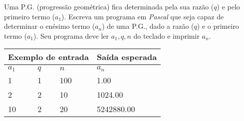 \item Uma P.G. (progressão geométrica) fica determinada pela sua razão ($q$) 
e pelo primeiro termo ($a_1$). Escreva um programa em \emph{Pascal} que 
seja capaz de determinar o enésimo termo ($a_n$) de uma P.G., dado a razão 
($q$) e o primeiro termo ($a_1$). Seu programa deve ler $a_1, q, n$ do 
teclado e imprimir $a_n$.

\begin{center}
\begin{tabular}{|l|l|l|l|} \hline
\multicolumn{3}{|c|}{Exemplo de entrada} & Saída esperada \\ \hline
$a_1$ & $q$ & $n$   & $a_n$               \\ \hline
1 & 1 & 100         & 1.00                \\ \hline
2 & 2 & 10          & 1024.00             \\ \hline
10 & 2 & 20         & 5242880.00          \\ \hline
\end{tabular}
\end{center}